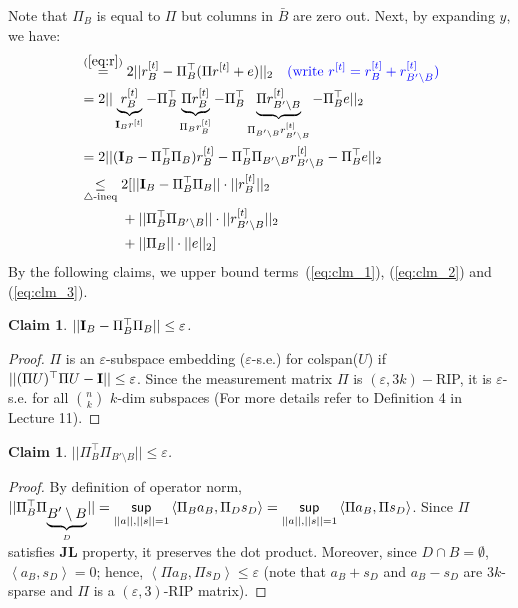 \documentclass[11pt]{article}
\newcommand{\eps}{\varepsilon}
\newcommand{\inprod}[1]{\left\langle #1 \right\rangle}
\newtheorem{claim}[theorem]{Claim}
\begin{document}
Note that $\Pi_B$ is equal to $\Pi$ but columns in $\bar{B}$ are zero out. Next, by expanding $y$, we have:
\begin{align}
&\overset{(\ref{eq:r})}{=} 2||r_B^{[t]} - \Pi_B^{\top}(\Pi r^{[t]} + e)||_2 \quad\text{\color{blue}(write $r^{[t]} = r_B^{[t]} + r_{B'\setminus B}^{[t]}$)} \nonumber \\
& = 2 || \underbrace{r_B^{[t]}}_{{\bf I}_{B}r^{[t]}} - \Pi_B^{\top}\underbrace{\Pi r_B^{[t]}}_{\Pi_B r_B^{[t]}} - \Pi_B^{\top} \underbrace{\Pi r_{B'\setminus B}^{[t]}}_{\Pi_{B'\setminus B} r_{B'\setminus B}^{[t]}} - \Pi_B^{\top}e||_2 \nonumber \\
&=2 ||({\bf I}_{B} - \Pi^{\top}_B \Pi_B)r_{B}^{[t]} - \Pi^{\top}_B\Pi_{B'\setminus B} r^{[t]}_{B'\setminus B} -\Pi_B^{\top}e||_2 \nonumber\\
&\underset{\triangle\text{-ineq}}{\leq} 2 [|| {\bf I}_B - \Pi^{\top}_B \Pi_B|| \cdot ||r_B^{[t]}||_2 \label{eq:clm_1} \\
		&\qquad \quad + ||\Pi^{\top}_B \Pi_{B'\setminus B}|| \cdot ||r_{B'\setminus B}^{[t]}||_2 \label{eq:clm_2}\\
		&\qquad \quad + ||\Pi_B|| \cdot ||e||_2] \label{eq:clm_3}
\end{align}
By the following claims, we upper bound terms~(\ref{eq:clm_1}), (\ref{eq:clm_2}) and (\ref{eq:clm_3}).  
\begin{claim}\label{clm:1}
$||{\bf I}_B - \Pi^{\top}_B \Pi_B|| \leq \eps$.
\end{claim}
\begin{proof}
$\Pi$ is an $\eps$-subspace embedding ($\eps$-s.e.) for colspan($U$) if $||(\Pi U)^{\top}\Pi U - {\bf I}|| \leq \eps$. Since the measurement matrix $\Pi$ is $(\eps, 3k)-$RIP, it is $\eps$-s.e. for all ${n \choose k}$ $k$-dim subspaces (For more details refer to Definition 4 in Lecture 11). 
\end{proof}
\begin{claim}\label{clm:2}
$||\Pi^{\top}_B \Pi_{B'\setminus B}|| \leq \eps$.
\end{claim}
\begin{proof}
By definition of operator norm, $||\Pi^{\top}_B \Pi_{\underbrace{B'\setminus B}_{D}}|| = \underset{||a||, ||s||=1}{\sf sup}\inprod{\Pi_Ba_B, \Pi_D s_D} = \underset{||a||, ||s||=1}{\sf sup} \inprod{\Pi a_B, \Pi s_D}$. Since $\Pi$ satisfies {\bf JL} property, it preserves the dot product. Moreover, since $D\cap B = \emptyset$, $\inprod{a_B, s_D} =0$; hence, $\inprod{\Pi a_B, \Pi s_D}\leq \eps$ (note that $a_B + s_D$ and $a_B - s_D$ are $3k$-sparse and $\Pi$ is a $(\eps,3)$-RIP matrix).
\end{proof}
\end{document}
